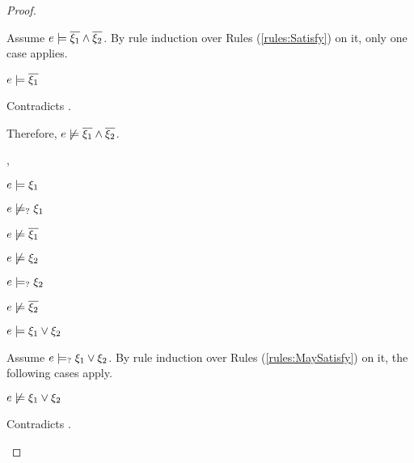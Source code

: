 \begin{proof}
\begin{byCases}
\begin{byCases}
        Assume $e \models \overline{\xi_1} \wedge \overline{\xi_2}$. By rule induction over Rules (\ref{rules:Satisfy}) on it, only one case applies.
        \begin{byCases}
        \item[\text{(\ref{rule:CSAnd})}]
            \begin{pfsteps*}
            \item $e \models \overline{\xi_1}$ 
            \end{pfsteps*}
            Contradicts .
        \end{byCases}
        Therefore, $e \not\models \overline{\xi_1} \wedge \overline{\xi_2}$.
    \item[\csatisfy{e}{\xi_1},\cmaysatisfy{e}{\xi_2}]
        \begin{pfsteps*}
        \item $e \models \xi_1$  
        \item $e \not\models_{?} \xi_1$  
        \item $e \not\models \overline{\xi_1}$  
        \item $e \not\models \xi_2$  
        \item $e \models_{?} \xi_2$  
        \item $e \not\models \overline{\xi_2}$  
        \item $e \models \xi_1 \vee \xi_2$  
        \end{pfsteps*}
        Assume $e \models_{?} \xi_1 \vee \xi_2$. By rule induction over Rules (\ref{rules:MaySatisfy}) on it, the following cases apply.
        \begin{byCases}
        \item[\text{(\ref{rule:CMSNotVal})}]
            \begin{pfsteps*}
            \item $e \not\models \xi_1 \vee \xi_2$ 
            \end{pfsteps*}
            Contradicts .
        \item[\text{(\ref{rule:CMSOr1})}]

\end{byCases}
\end{byCases}
\end{byCases}
\end{proof}
